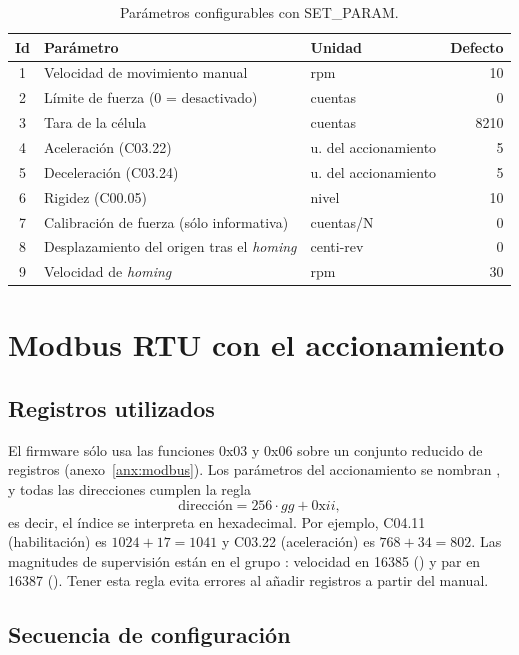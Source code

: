 \begin{table}[H]
\centering
\caption{Parámetros configurables con SET\_PARAM.}
\label{tab:parametros}
\begin{tabular}{@{}cllr@{}}
\toprule
Id & Parámetro & Unidad & Defecto \\
\midrule
1 & Velocidad de movimiento manual & rpm & 10 \\
2 & Límite de fuerza (0 = desactivado) & cuentas & 0 \\
3 & Tara de la célula & cuentas & 8210 \\
4 & Aceleración (C03.22) & u. del accionamiento & 5 \\
5 & Deceleración (C03.24) & u. del accionamiento & 5 \\
6 & Rigidez (C00.05) & nivel & 10 \\
7 & Calibración de fuerza (sólo informativa) & cuentas/N & 0 \\
8 & Desplazamiento del origen tras el \emph{homing} & centi-rev & 0 \\
9 & Velocidad de \emph{homing} & rpm & 30 \\
\bottomrule
\end{tabular}
\end{table}

\section{Modbus RTU con el accionamiento}

\subsection{Registros utilizados}

El firmware sólo usa las funciones 0x03 y 0x06 sobre un conjunto reducido de registros
(anexo~\ref{anx:modbus}). Los parámetros del accionamiento se nombran , y todas las
direcciones cumplen la regla
\begin{equation}
  \text{dirección} = 256\cdot gg + \text{0x}ii,
\end{equation}
es decir, el índice se interpreta en hexadecimal. Por ejemplo, C04.11 (habilitación) es
$1024 + 17 = 1041$ y C03.22 (aceleración) es $768 + 34 = 802$. Las magnitudes de supervisión están en
el grupo : velocidad en 16385 () y par en 16387 (). Tener
esta regla evita errores al añadir registros a partir del manual.

\subsection{Secuencia de configuración}

